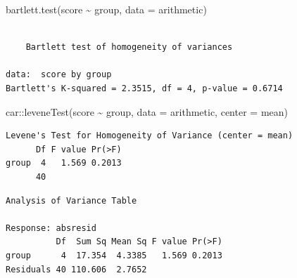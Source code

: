 \documentclass[
  11pt,
  letterpaper,
]{scrbook}
\newenvironment{Shaded}{\begin{snugshade}}{\end{snugshade}}
\newcommand{\AttributeTok}[1]{\textcolor[rgb]{0.40,0.45,0.13}{#1}}
\newcommand{\CommentTok}[1]{\textcolor[rgb]{0.37,0.37,0.37}{#1}}
\newcommand{\FunctionTok}[1]{\textcolor[rgb]{0.28,0.35,0.67}{#1}}
\newcommand{\NormalTok}[1]{\textcolor[rgb]{0.00,0.23,0.31}{#1}}
\newcommand{\OtherTok}[1]{\textcolor[rgb]{0.00,0.23,0.31}{#1}}
\newcommand{\SpecialCharTok}[1]{\textcolor[rgb]{0.37,0.37,0.37}{#1}}
\theoremstyle{definition}
\theoremstyle{definition}
\theoremstyle{remark}
\begin{document}
\begin{Shaded}
\begin{Highlighting}[]
\FunctionTok{bartlett.test}\NormalTok{(score }\SpecialCharTok{\textasciitilde{}}\NormalTok{ group,}
              \AttributeTok{data =}\NormalTok{ arithmetic)}
\end{Highlighting}
\end{Shaded}

\begin{verbatim}

    Bartlett test of homogeneity of variances

data:  score by group
Bartlett's K-squared = 2.3515, df = 4, p-value = 0.6714
\end{verbatim}

\begin{Shaded}
\begin{Highlighting}[]
\NormalTok{car}\SpecialCharTok{::}\FunctionTok{leveneTest}\NormalTok{(score }\SpecialCharTok{\textasciitilde{}}\NormalTok{ group,}
                \AttributeTok{data =}\NormalTok{ arithmetic,}
                \AttributeTok{center =}\NormalTok{ mean)}
\end{Highlighting}
\end{Shaded}

\begin{verbatim}
Levene's Test for Homogeneity of Variance (center = mean)
      Df F value Pr(>F)
group  4   1.569 0.2013
      40               
\end{verbatim}

\begin{Shaded}
\end{Shaded}

\begin{verbatim}
Analysis of Variance Table

Response: absresid
          Df  Sum Sq Mean Sq F value Pr(>F)
group      4  17.354  4.3385   1.569 0.2013
Residuals 40 110.606  2.7652               
\end{verbatim}
\end{document}
